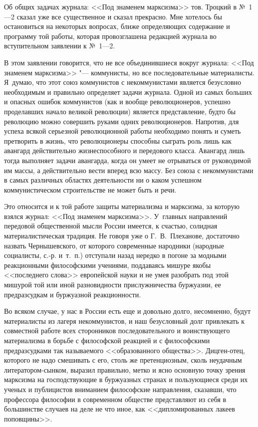 Об общих задачах журнала: <<Под знаменем марксизма>> тов. Троцкий в №~1---2
сказал уже все существенное и сказал прекрасно. Мне хотелось бы
остановиться на некоторых вопросах, ближе определяющих содержание и
программу той работы, которая провозглашена редакцией журнала во
вступительном заявлении к №~1---2.

В этом заявлении говорится, что не все объединившиеся вокруг журнала: <<Под
знаменем марксизма>> "--- коммунисты, но все последовательные материалисты.
Я~думаю, что этот союз коммунистов с некоммунистами является безусловно
необходимым и правильно определяет задачи журнала. Одной из самых больших и
опасных ошибок коммунистов (как и вообще революционеров, успешно
проделавших начало великой революции) является представление, будто бы
революцию можно совершить руками одних революционеров. Напротив, для успеха
всякой серьезной революционной работы необходимо понять и суметь претворить
в жизнь, что революционеры способны сыграть роль лишь как авангард
действительно жизнеспособного и передового класса. Авангард лишь тогда
выполняет задачи авангарда, когда он умеет не отрываться от руководимой им
массы, а действительно вести вперед всю массу. Без союза с некоммунистами в
самых различных областях деятельности ни о каком успешном коммунистическом
строительстве не может быть и речи.

Это относится и к той работе защиты материализма и марксизма, за которую
взялся журнал: <<Под знаменем марксизма>>. У~главных направлений передовой
общественной мысли России имеется, к счастью, солидная материалистическая
традиция. Не говоря уже о Г.~В.~Плеханове, достаточно назвать
Чернышевского, от которого современные народники (народные социалисты,
с.-р. и~т.~п.) отступали назад нередко в погоне за модными реакционными
философскими учениями, поддаваясь мишуре якобы <<последнего слова>>
европейской науки и не умея разобрать под этой мишурой той или иной
разновидности прислужничества буржуазии, ее предразсудкам и буржуазной
реакционности.

Во всяком случае, у нас в России есть еще и довольно долго, несомненно,
будут материалисты из лагеря некоммунистов, и наш безусловный долг
привлекать к совместной работе всех сторонников последовательного и
воинствующего материализма в борьбе с философской реакцией и с философскими
предразсудками так называемого <<образованного общества>>. Дицген-отец,
которого не надо смешивать с его, столь же претенциозным, сколь неудачным
литератором-сынком, выразил правильно, метко и ясно основную точку зрения
марксизма на господствующие в буржуазных странах и пользующиеся среди их
ученых и публицистов вниманием философские направления, сказавши, что
профессора философии в современном обществе представляют из себя в
большинстве случаев на деле не что иное, как <<дипломированных лакеев
поповщины>>.

